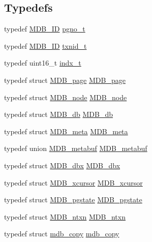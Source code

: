 \subsection*{Typedefs}
\begin{DoxyCompactItemize}
\item 
typedef \mbox{\hyperlink{group__idls_ga792192229a977c49f083846b5635f92d}{M\+D\+B\+\_\+\+ID}} \mbox{\hyperlink{group__internal_gadb65f0424c9d3827bf6409087ad555cd}{pgno\+\_\+t}}
\item 
typedef \mbox{\hyperlink{group__idls_ga792192229a977c49f083846b5635f92d}{M\+D\+B\+\_\+\+ID}} \mbox{\hyperlink{group__internal_gabbaef7c9c710f8652a62c32d748c040e}{txnid\+\_\+t}}
\item 
typedef uint16\+\_\+t \mbox{\hyperlink{group__internal_ga730e17f748208d77496ebd895c8375dc}{indx\+\_\+t}}
\item 
typedef struct \mbox{\hyperlink{struct_m_d_b__page}{M\+D\+B\+\_\+page}} \mbox{\hyperlink{group__internal_ga200680e541f7a879b55362b90bea3f2a}{M\+D\+B\+\_\+page}}
\item 
typedef struct \mbox{\hyperlink{struct_m_d_b__node}{M\+D\+B\+\_\+node}} \mbox{\hyperlink{group__internal_gaab9ae9db09d810de380a91cbe31b7455}{M\+D\+B\+\_\+node}}
\item 
typedef struct \mbox{\hyperlink{struct_m_d_b__db}{M\+D\+B\+\_\+db}} \mbox{\hyperlink{group__internal_ga58702e509a15e026f4a5c64d818011e4}{M\+D\+B\+\_\+db}}
\item 
typedef struct \mbox{\hyperlink{struct_m_d_b__meta}{M\+D\+B\+\_\+meta}} \mbox{\hyperlink{group__internal_gaaada41b50ed7a979eef130252feecb52}{M\+D\+B\+\_\+meta}}
\item 
typedef union \mbox{\hyperlink{union_m_d_b__metabuf}{M\+D\+B\+\_\+metabuf}} \mbox{\hyperlink{group__internal_gab4038dee16737a7eae5b26ea0b7bc3b9}{M\+D\+B\+\_\+metabuf}}
\item 
typedef struct \mbox{\hyperlink{struct_m_d_b__dbx}{M\+D\+B\+\_\+dbx}} \mbox{\hyperlink{group__internal_ga8d4f6f53db6f2935433429212467e0fa}{M\+D\+B\+\_\+dbx}}
\item 
typedef struct \mbox{\hyperlink{struct_m_d_b__xcursor}{M\+D\+B\+\_\+xcursor}} \mbox{\hyperlink{group__internal_ga5840a44a24890c3b76666d2557c37e1d}{M\+D\+B\+\_\+xcursor}}
\item 
typedef struct \mbox{\hyperlink{struct_m_d_b__pgstate}{M\+D\+B\+\_\+pgstate}} \mbox{\hyperlink{group__internal_gaaf0ef2e223705599fedc655ce6512319}{M\+D\+B\+\_\+pgstate}}
\item 
typedef struct \mbox{\hyperlink{struct_m_d_b__ntxn}{M\+D\+B\+\_\+ntxn}} \mbox{\hyperlink{group__internal_gaae1a99b26a7daa2324c1cc854d4f1bae}{M\+D\+B\+\_\+ntxn}}
\item 
typedef struct \mbox{\hyperlink{structmdb__copy}{mdb\+\_\+copy}} \mbox{\hyperlink{group__internal_ga5e8c249078ee035ffbd91eb61628e5bb}{mdb\+\_\+copy}}
\end{DoxyCompactItemize}
